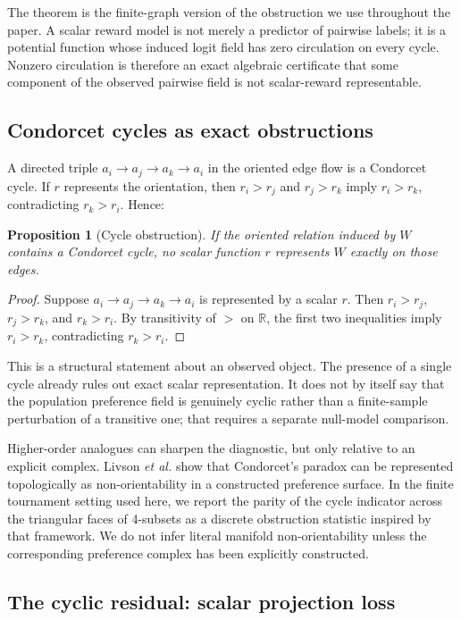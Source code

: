 \documentclass[10pt]{article}
\newtheorem{proposition}[theorem]{Proposition}
\theoremstyle{definition}
\theoremstyle{remark}
\begin{document}
The theorem is the finite-graph version of the obstruction we use throughout the paper. A scalar reward model is not merely a predictor of pairwise labels; it is a potential function whose induced logit field has zero circulation on every cycle. Nonzero circulation is therefore an exact algebraic certificate that some component of the observed pairwise field is not scalar-reward representable.

\subsection{Condorcet cycles as exact obstructions}

A directed triple $a_i \to a_j \to a_k \to a_i$ in the oriented edge flow is a Condorcet cycle. If $r$ represents the orientation, then $r_i > r_j$ and $r_j > r_k$ imply $r_i > r_k$, contradicting $r_k > r_i$. Hence:

\begin{proposition}[Cycle obstruction]\label{prop:cycle}
If the oriented relation induced by $W$ contains a Condorcet cycle, no scalar function $r$ represents $W$ exactly on those edges.
\end{proposition}
\begin{proof}
Suppose $a_i\to a_j\to a_k\to a_i$ is represented by a scalar $r$. Then $r_i>r_j$, $r_j>r_k$, and $r_k>r_i$. By transitivity of $>$ on $\mathbb{R}$, the first two inequalities imply $r_i>r_k$, contradicting $r_k>r_i$.
\end{proof}

This is a structural statement about an observed object. The presence of a single cycle already rules out exact scalar representation. It does not by itself say that the population preference field is genuinely cyclic rather than a finite-sample perturbation of a transitive one; that requires a separate null-model comparison.

Higher-order analogues can sharpen the diagnostic, but only relative to an explicit complex. Livson \emph{et al.}\cite{livson2026} show that Condorcet's paradox can be represented topologically as non-orientability in a constructed preference surface. In the finite tournament setting used here, we report the parity of the cycle indicator across the triangular faces of 4-subsets as a discrete obstruction statistic inspired by that framework. We do not infer literal manifold non-orientability unless the corresponding preference complex has been explicitly constructed.

\subsection{The cyclic residual: scalar projection loss}
\end{document}
